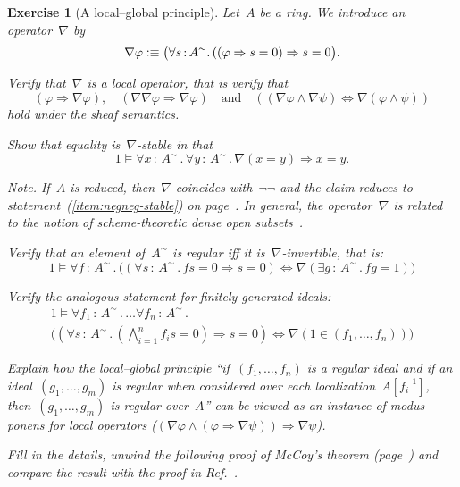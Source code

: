 \documentclass{ws-rv9x6}
\newtheorem{ex}{Exercise}
\newenvironment{exercise}[1]{
  \begin{ex}[#1]
}{\end{ex}}
\newcommand{\defeqv}{\vcentcolon\equiv}
\renewcommand{\_}{\mathpunct{.}}
\newcommand{\?}{\,{:}\,}
\begin{document}
\begin{exercise}{A local--global principle}%
\label{ex:local-global}%
Let~$A$ be a ring. We introduce an operator~$\nabla$ by
\[ \nabla\varphi \defeqv \bigl(\forall s\?A^\sim\_ ((\varphi \Rightarrow s = 0)
\Rightarrow s = 0\bigr).\]
\begin{alphlist}[(f)]
\item Verify that~$\nabla$ is a \emph{local operator}, that is verify that
\[ (\varphi \Rightarrow \nabla\varphi), \quad
(\nabla\nabla\varphi \Rightarrow \nabla\varphi) \quad\text{and}\quad
((\nabla\varphi \wedge \nabla\psi) \Leftrightarrow \nabla(\varphi \wedge \psi))
\]
hold under the sheaf semantics.
\item Show that equality is~$\nabla$-stable in that
\[ 1 \models \forall x\?A^\sim\_ \forall y\?A^\sim\_ \nabla(x = y) \Rightarrow x = y. \]

{\scriptsize\emph{Note.} If~$A$ is reduced, then~$\nabla$ coincides
with~$\neg\neg$ and the claim reduces to statement~(\ref{item:negneg-stable})
on page~\pageref{item:negneg-stable}. In general, the operator~$\nabla$ is
related to the notion of \emph{scheme-theoretic dense open
subsets}~\cite[Lemma~9.11]{blechschmidt:phd}.\par}
\item Verify that an element of~$A^\sim$ is regular iff it
is~$\nabla$-invertible, that is:
\[ 1 \models \forall f\?A^\sim\_
  \bigl(
    (\forall s\?A^\sim\_ fs = 0 \Rightarrow s = 0) \Longleftrightarrow
    \nabla(\exists g\?A^\sim\_ fg = 1)
  \bigr)
\]
\item Verify the analogous statement for finitely generated ideals:
\begin{multline*}1 \models \forall f_1\?A^\sim\_ \ldots \forall f_n\?A^\sim\_ \\
  \bigl(
    (\forall s\?A^\sim\_ (\textstyle\bigwedge_{i=1}^n f_is = 0) \Rightarrow s = 0) \Longleftrightarrow
    \nabla(1 \in (f_1,\ldots,f_n))
  \bigr) \end{multline*}
\item Explain how the local--global principle ``if~$(f_1,\ldots,f_n)$ is a
regular ideal and if an ideal~$(g_1,\ldots,g_m)$ is regular when considered
over each localization~$A[f_i^{-1}]$, then~$(g_1,\ldots,g_m)$ is regular
over~$A$'' can be viewed as an instance of modus ponens for local operators
($(\nabla\varphi \wedge (\varphi \Rightarrow \nabla\psi)) \Longrightarrow
\nabla\psi$).
\item Fill in the details, unwind the following proof of McCoy's theorem
(page~\pageref{par:mccoy}) and compare the result with the proof in
Ref.~\cite[Theorem~2.4]{coquand-quitte:constructive-finite-free-resolutions}.


\end{alphlist}
\end{exercise}
\end{document}
